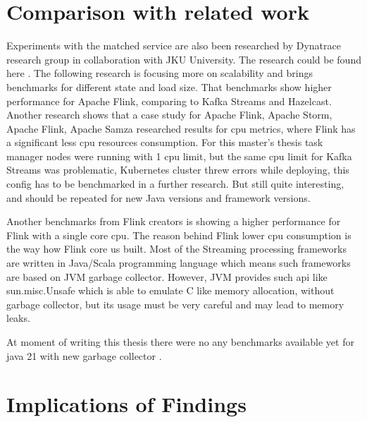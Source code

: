 \section{Comparison with related work}\label{sec:comparison-with-existing-literature}
Experiments with the matched service are also been researched by Dynatrace research
group in collaboration with JKU University.
The research could be found here \cite{ICPE2024}.
The following research is focusing more on scalability and brings benchmarks
for different state and load size.
That benchmarks show higher performance for Apache Flink, comparing to Kafka Streams and
Hazelcast.
Another research \cite{inoubli2018comparative} shows that a case study for
Apache Flink, Apache Storm, Apache Flink, Apache Samza researched results
for cpu metrics, where Flink has a significant less cpu resources consumption.
For this master's thesis task manager nodes were running with 1 cpu limit,
but the same cpu limit for Kafka Streams was problematic, Kubernetes cluster threw
errors while deploying, this config has to be benchmarked in a further research.
But still \cite{inoubli2018comparative} quite interesting, and should be repeated
for new Java versions and framework versions.

Another benchmarks \cite{flink_spark_vervica_2} from Flink creators is showing
a higher performance for Flink with a single core cpu.
The reason behind Flink lower cpu consumption is the way how Flink core us built.
Most of the Streaming processing frameworks are written in Java/Scala programming
language which means such frameworks are based on JVM garbage collector.
However, JVM provides such api like sun.misc.Unsafe which is able to emulate
C like memory allocation, without garbage collector, but its usage must
be very careful and may lead to memory leaks.
\cite{java_jvm, java_jvm_oracle, usafe_usage, usafe_usage_2}

At moment of writing this thesis there were no any benchmarks available yet
for java 21 with new garbage collector \cite{java_21_new_gc}.


\section{Implications of Findings}\label{sec:implications-of-findings}

